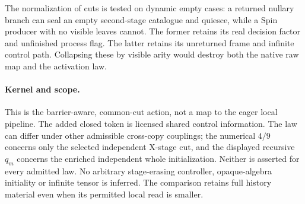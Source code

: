 \documentclass{article}
\begin{document}
The normalization of cuts is tested on dynamic empty cases: a returned nullary branch can seal an empty second-stage catalogue and quiesce, while a Spin producer with no visible leaves cannot. The former retains its real decision factor and unfinished process flag. The latter retains its unreturned frame and infinite control path. Collapsing these by visible arity would destroy both the native raw map and the activation law.

\paragraph{Kernel and scope.} This is the barrier-aware, common-cut action, not a map to the eager local pipeline. The added closed token is licensed shared control information. The law can differ under other admissible cross-copy couplings; the numerical $4/9$ concerns only the selected independent X-stage cut, and the displayed recursive $q_m$ concerns the enriched independent whole initialization. Neither is asserted for every admitted law. No arbitrary stage-erasing controller, opaque-algebra initiality or infinite tensor is inferred. The comparison retains full history material even when its permitted local read is smaller.
\end{document}

